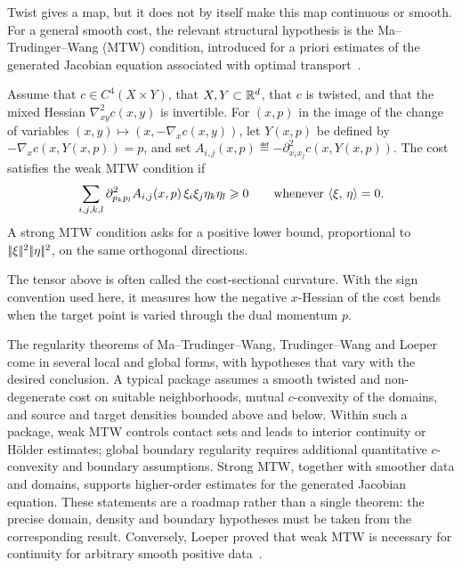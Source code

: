 Twist gives a map, but it does not by itself make this map continuous or smooth. For a general smooth cost, the relevant structural hypothesis is the Ma--Trudinger--Wang (MTW) condition, introduced for a priori estimates of the generated Jacobian equation associated with optimal transport~\cite{ma2005regularity,trudinger2001monge}.

\begin{defn}\label{def-mtw-condition}
	Assume that $c\in C^4(X\times Y)$, that $X,Y\subset\mathbb{R}^d$, that $c$ is twisted, and that the mixed Hessian $\nabla^2_{xy}c(x,y)$ is invertible. For $(x,p)$ in the image of the change of variables $(x,y)\mapsto(x,-\nabla_x c(x,y))$, let $Y(x,p)$ be defined by
	$-\nabla_x c(x,Y(x,p))=p$, and set
	$A_{i,j}(x,p)\eqdef-\partial^2_{x_i x_j}c(x,Y(x,p))$.
	The cost satisfies the weak MTW condition if
	\[
		\sum_{i,j,k,l}\partial^2_{p_k p_l} A_{i,j}(x,p)\,\xi_i\xi_j\eta_k\eta_l\geqslant0
		\qquad\text{whenever }\langle \xi,\,\eta\rangle=0.
	\]
	A strong MTW condition asks for a positive lower bound, proportional to $|\!| \xi |\!|^2|\!| \eta |\!|^2$, on the same orthogonal directions.
\end{defn}

The tensor above is often called the cost-sectional curvature. With the sign convention used here, it measures how the negative $x$-Hessian of the cost bends when the target point is varied through the dual momentum $p$.

\begin{rem}\label{rem-mtw-regularity-landscape}\label{prop-mtw-regularity-implication}
	The regularity theorems of Ma--Trudinger--Wang, Trudinger--Wang and Loeper come in several local and global forms, with hypotheses that vary with the desired conclusion. A typical package assumes a smooth twisted and non-degenerate cost on suitable neighborhoods, mutual $c$-convexity of the domains, and source and target densities bounded above and below. Within such a package, weak MTW controls contact sets and leads to interior continuity or H\"older estimates; global boundary regularity requires additional quantitative $c$-convexity and boundary assumptions. Strong MTW, together with smoother data and domains, supports higher-order estimates for the generated Jacobian equation. These statements are a roadmap rather than a single theorem: the precise domain, density and boundary hypotheses must be taken from the corresponding result. Conversely, Loeper proved that weak MTW is necessary for continuity for arbitrary smooth positive data~\cite{ma2005regularity,trudinger2001monge,loeper2009regularity,Villani09}.
\end{rem}

